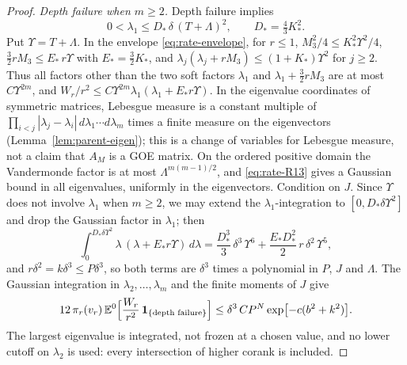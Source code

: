 \begin{proof}
\emph{Depth failure when $m\ge2$.} Depth failure implies
\[
0<\lambda_1\le D_*\,\delta\,(T+\Lambda)^2,\qquad D_*=\tfrac43K_*^2 .
\]
Put $\Upsilon=T+\Lambda$. In the envelope \eqref{eq:rate-envelope}, for $r\le1$, $M_3^2/4\le K_*^2\Upsilon^2/4$, $\tfrac32rM_3\le E_*\,r\Upsilon$ with $E_*=\tfrac32K_*$, and $\lambda_j(\lambda_j+rM_3)\le(1+K_*)\Upsilon^2$ for $j\ge2$. Thus all factors other than the two soft factors $\lambda_1$ and $\lambda_1+\frac32rM_3$ are at most $C\Upsilon^{2m}$, and $W_r/r^2\le C\Upsilon^{2m}\lambda_1(\lambda_1+E_*r\Upsilon)$. In the eigenvalue coordinates of symmetric matrices, Lebesgue measure is a constant multiple of $\prod_{i<j}|\lambda_j-\lambda_i|\,d\lambda_1\cdots d\lambda_m$ times a finite measure on the eigenvectors \cite[\S7]{parentP} (Lemma~\ref{lem:parent-eigen}); this is a change of variables for Lebesgue measure, not a claim that $A_M$ is a GOE matrix. On the ordered positive domain the Vandermonde factor is at most $\Lambda^{m(m-1)/2}$, and \eqref{eq:rate-R13} gives a Gaussian bound in all eigenvalues, uniformly in the eigenvectors. Condition on $J$. Since $\Upsilon$ does not involve $\lambda_1$ when $m\ge2$, we may extend the $\lambda_1$-integration to $[0,D_*\delta\Upsilon^2]$ and drop the Gaussian factor in $\lambda_1$; then
\[
\int_0^{D_*\delta\Upsilon^2}\lambda\,(\lambda+E_*r\Upsilon)\,d\lambda=\frac{D_*^3}3\,\delta^3\,\Upsilon^6+\frac{E_*D_*^2}2\,r\,\delta^2\,\Upsilon^5,
\]
and $r\delta^2=k\delta^3\le P\delta^3$, so both terms are $\delta^3$ times a polynomial in $P$, $J$ and $\Lambda$. The Gaussian integration in $\lambda_2,\dots,\lambda_m$ and the finite moments of $J$ give
\[
12\,\pi_r(v_r)\,\mathbb E^0\Bigl[\frac{W_r}{r^2}\,\mathbf 1_{\{\text{depth failure}\}}\Bigr]\le\delta^3\,CP^N\exp\bigl[-c(b^2+k^2)\bigr].
\]
The largest eigenvalue is integrated, not frozen at a chosen value, and no lower cutoff on $\lambda_2$ is used: every intersection of higher corank is included.


\end{proof}
